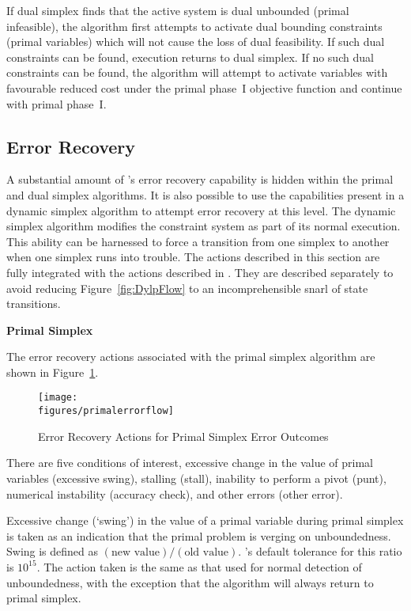 If dual simplex finds that the active system is dual unbounded (primal
infeasible), the algorithm first attempts to activate dual bounding
constraints (primal variables) which will not cause the loss of dual
feasibility.
If such dual constraints can be found, execution returns to dual simplex.
If no such dual constraints can be found, the algorithm will attempt to
activate variables with favourable reduced cost under the primal phase~I
objective function and continue with primal phase~I\@.

\subsection{Error Recovery}
\label{sec:ErrorRecovery}

A substantial amount of \dylp's error recovery capability is hidden within the
primal and dual simplex algorithms.
It is also possible to use the capabilities present in a dynamic
simplex algorithm to attempt error recovery at this level.
The dynamic simplex algorithm modifies the constraint system as part
of its normal execution.
This ability can be harnessed to force a transition from one simplex to
another when one simplex runs into trouble.
The actions described in this section are fully integrated with the actions
described in .
They are described separately to avoid reducing Figure~\ref{fig:DylpFlow} to
an incomprehensible snarl of state transitions.

\noindent
\textbf{Primal Simplex}

The error recovery actions associated with the primal simplex algorithm are
shown in Figure~\ref{fig:DynErrRecPrimal}.
\begin{figure}
\centering
\texttt{[image: \\figures/primalerrorflow]}
\caption{Error Recovery Actions for Primal Simplex Error Outcomes}
\label{fig:DynErrRecPrimal}
\end{figure}
There are five conditions of interest, excessive change in the value of primal
variables (excessive swing), stalling (stall), inability to perform a pivot
(punt), numerical instability (accuracy check), and other errors (other
error).

Excessive change (`swing') in the value of a primal variable during primal
simplex is taken as an
indication that the primal problem is verging on unboundedness.
Swing is defined as $(\textrm{new value})/(\textrm{old value})$.
\dylp's default tolerance for this ratio is $10^{15}$.
The action taken is the same as that used for normal detection of
unboundedness, with the exception that the algorithm will always return to
primal simplex.

